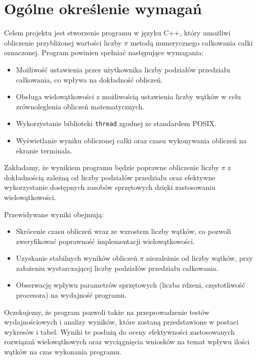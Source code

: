 \newpage
\section{Ogólne określenie wymagań}		%
Celem projektu jest stworzenie programu w języku C++, który umożliwi obliczenie przybliżonej wartości liczby \(\pi\) metodą numerycznego całkowania całki oznaczonej. Program powinien spełniać następujące wymagania:

\begin{itemize}
  \item Możliwość ustawienia przez użytkownika liczby podziałów przedziału całkowania, co wpływa na dokładność obliczeń.
  \item Obsługa wielowątkowości z możliwością ustawienia liczby wątków w celu zrównoleglenia obliczeń matematycznych.
  \item Wykorzystanie biblioteki \texttt{thread} zgodnej ze standardem POSIX.
  \item Wyświetlanie wyniku obliczonej całki oraz czasu wykonywania obliczeń na ekranie terminala.
\end{itemize}

Zakładamy, że wynikiem programu będzie poprawne obliczenie liczby \(\pi\) z dokładnością zależną od liczby podziałów przedziału oraz efektywne wykorzystanie dostępnych zasobów sprzętowych dzięki zastosowaniu wielowątkowości.

Przewidywane wyniki obejmują:
\begin{itemize}
  \item Skrócenie czasu obliczeń wraz ze wzrostem liczby wątków, co pozwoli zweryfikować poprawność implementacji wielowątkowości.
  \item Uzyskanie stabilnych wyników obliczeń \(\pi\) niezależnie od liczby wątków, przy założeniu wystarczającej liczby podziałów przedziału całkowania.
  \item Obserwację wpływu parametrów sprzętowych (liczba rdzeni, częstotliwość procesora) na wydajność programu.
\end{itemize}

Oczekujemy, że program pozwoli także na przeprowadzenie testów wydajnościowych i analizy wyników, które zostaną przedstawione w postaci wykresów i tabel. Wyniki te posłużą do oceny efektywności zastosowanych rozwiązań wielowątkowych oraz wyciągnięcia wniosków na temat wpływu ilości wątków na czas wykonania programu.
